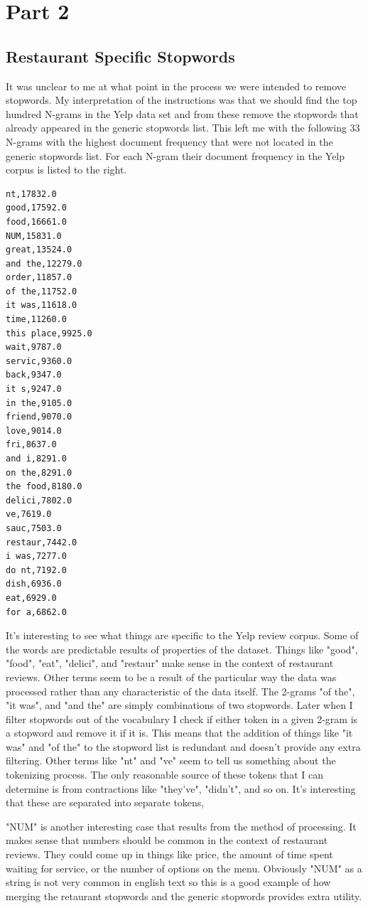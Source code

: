 \documentclass[paper=a4, fontsize=11pt]{jhwhw} %
\begin{document}
\section{Part 2}
\subsection{Restaurant Specific Stopwords}
It was unclear to me at what point in the process we were intended to remove stopwords. My interpretation of the instructions was that we should find the top hundred N-grams in the Yelp data set and from these remove the stopwords that already appeared in the generic stopwords list. This left me with the following 33 N-grams with the highest document frequency that were not located in the generic stopwords list. For each N-gram their document frequency in the Yelp corpus is listed to the right. 
\begin{verbatim}
nt,17832.0
good,17592.0
food,16661.0
NUM,15831.0
great,13524.0
and the,12279.0
order,11857.0
of the,11752.0
it was,11618.0
time,11260.0
this place,9925.0
wait,9787.0
servic,9360.0
back,9347.0
it s,9247.0
in the,9105.0
friend,9070.0
love,9014.0
fri,8637.0
and i,8291.0
on the,8291.0
the food,8180.0
delici,7802.0
ve,7619.0
sauc,7503.0
restaur,7442.0
i was,7277.0
do nt,7192.0
dish,6936.0
eat,6929.0
for a,6862.0
\end{verbatim}

It's interesting to see what things are specific to the Yelp review corpus. Some of the words are predictable results of properties of the dataset. Things like "good", "food", "eat", "delici", and "restaur" make sense in the context of restaurant reviews. Other terms seem to be a result of the particular way the data was processed rather than any characteristic of the data itself. The 2-grams "of the", "it was", and "and the" are simply combinations of two stopwords. Later when I filter stopwords out of the vocabulary I check if either token in a given 2-gram is a stopword and remove it if it is. This means that the addition of things like "it was" and "of the" to the stopword list is redundant and doesn't provide any extra filtering. Other terms like "nt" and "ve" seem to tell us something about the tokenizing process. The only reasonable source of these tokens that I can determine is from contractions like "they've", "didn't", and so on. It's interesting that these are separated into separate tokens, 

"NUM" is another interesting case that results from the method of processing. It makes sense that numbers should be common in the context of restaurant reviews. They could come up in things like price, the amount of time spent waiting for service, or the number of options on the menu. Obviously "NUM" as a string is not very common in english text so this is a good example of how merging the retaurant stopwords and the generic stopwords provides extra utility. 
\end{document}
